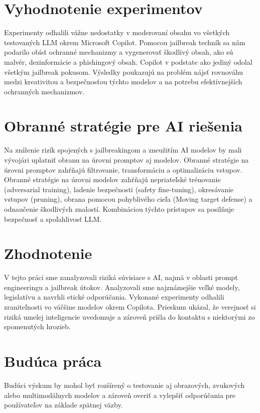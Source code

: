 \section*{Vyhodnotenie experimentov \label{sec:experiments_eval_resume}}

Experimenty odhalili vážne nedostatky v moderovaní obsahu vo všetkých testovaných LLM okrem Microsoft Copilot. Pomocou jailbreak techník sa nám podarilo obísť ochranné mechanizmy a vygenerovať škodlivý obsah, ako sú malvér, dezinformácie a phishingový obsah. Copilot v podstate ako jediný odolal všetkým jailbreak pokusom. Výsledky poukazujú na problém nájsť rovnováhu medzi kreativitou a bezpečnosťou týchto modelov a na potrebu efektívnejších ochranných mechanizmov.

\section*{Obranné stratégie pre AI riešenia \label{sec:mitigation_strategies_resume}}

Na zníženie rizík spojených s jailbreakingom a zneužitím AI modelov by mali vývojári uplatniť obranu na úrovni promptov aj modelov. Obranné stratégie na úrovni promptov zahŕňajú filtrovanie, transformáciu a optimalizáciu vstupov. Obranné stratégie na úrovni modelov zahŕňajú nepriateľské trénovanie (adversarial training), ladenie bezpečnosti (safety fine-tuning), okresávanie vstupov (pruning), obrana pomocou pohyblivého cieľa (Moving target defense) a odnaučenie škodlivých znalostí. Kombináciou týchto prístupov sa posilňuje bezpečnosť a spoľahlivosť LLM.

\section*{Zhodnotenie \label{sec:conclusion_summary_resume}}

V tejto práci sme zanalyzovali riziká súvisiace s AI, najmä v oblasti prompt engineeringu a jailbreak útokov. Analyzovali sme najznámejšie veľké modely, legislatívu a navrhli etické odporúčania. Vykonané experimenty odhalili zraniteľnosti vo väčšine modelov okrem Copilota. Prieskum ukázal, že verejnosť si riziká umelej inteligencie uvedomuje a zároveň prišla do kontaktu s niektorými zo spomenutých hrozieb.

\section*{Budúca práca \label{sec:future_work_resume}}

Budúci výskum by mohol byť rozšírený o testovanie aj obrazových, zvukových alebo multimodálnych modelov a zároveň overiť a vylepšiť odporúčania pre používateľov na základe spätnej väzby.
